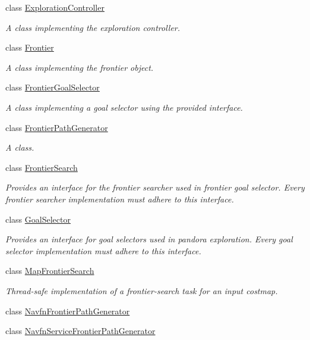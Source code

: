 \begin{DoxyCompactItemize}
class \hyperlink{classpandora__exploration_1_1_exploration_controller}{\-Exploration\-Controller}
\begin{DoxyCompactList}\small\item\em \-A class implementing the exploration controller. \end{DoxyCompactList}\item 
class \hyperlink{classpandora__exploration_1_1_frontier}{\-Frontier}
\begin{DoxyCompactList}\small\item\em \-A class implementing the frontier object. \end{DoxyCompactList}\item 
class \hyperlink{classpandora__exploration_1_1_frontier_goal_selector}{\-Frontier\-Goal\-Selector}
\begin{DoxyCompactList}\small\item\em \-A class implementing a goal selector using the provided interface. \end{DoxyCompactList}\item 
class \hyperlink{classpandora__exploration_1_1_frontier_path_generator}{\-Frontier\-Path\-Generator}
\begin{DoxyCompactList}\small\item\em \-A class. \end{DoxyCompactList}\item 
class \hyperlink{classpandora__exploration_1_1_frontier_search}{\-Frontier\-Search}
\begin{DoxyCompactList}\small\item\em \-Provides an interface for the frontier searcher used in frontier goal selector. \-Every frontier searcher implementation must adhere to this interface. \end{DoxyCompactList}\item 
class \hyperlink{classpandora__exploration_1_1_goal_selector}{\-Goal\-Selector}
\begin{DoxyCompactList}\small\item\em \-Provides an interface for goal selectors used in pandora exploration. \-Every goal selector implementation must adhere to this interface. \end{DoxyCompactList}\item 
class \hyperlink{classpandora__exploration_1_1_map_frontier_search}{\-Map\-Frontier\-Search}
\begin{DoxyCompactList}\small\item\em \-Thread-\/safe implementation of a frontier-\/search task for an input costmap. \end{DoxyCompactList}\item 
class \hyperlink{classpandora__exploration_1_1_navfn_frontier_path_generator}{\-Navfn\-Frontier\-Path\-Generator}
\item 
class \hyperlink{classpandora__exploration_1_1_navfn_service_frontier_path_generator}{\-Navfn\-Service\-Frontier\-Path\-Generator}
\end{DoxyCompactItemize}
